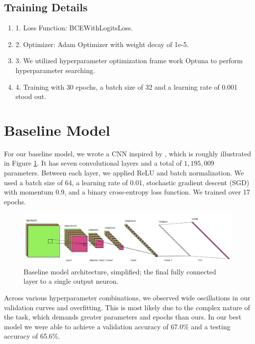 \documentclass{article} %
\begin{document}
\subsection{Training Details}
\begin {enumerate}
\item[1.]Loss Function: BCEWithLogitsLoss.
\item[2.]Optimizer: Adam Optimizer with weight decay of 1e-5.
\item[3.]We utilized hyperparameter optimization frame work Optuna \citep{akiba2019optuna} to perform hyperparameter searching. 
\item[4.]Training with 30 epochs, a batch size of 32 and a learning rate of 0.001 stood out.
\end{enumerate}

\section{Baseline Model}

For our baseline model, we wrote a CNN inspired by \citet{wang2020cnngeneratedimagessurprisinglyeasy}, which is roughly illustrated in Figure \ref{fig:baseline_arch}. It has seven convolutional layers and a total of $1,195,009$ parameters. Between each layer, we applied ReLU and batch normalization. We used a batch size of 64, a learning rate of 0.01, stochastic gradient descent (SGD) with momentum 0.9, and a binary cross-entropy loss function. We trained over 17 epochs.

\begin{figure}[h]
    \begin{center}
        \includegraphics[scale=0.45]{figs/baseline.png}
    \end{center}
    \caption{Baseline model architecture, simplified; the final fully connected layer to a single output neuron.}
    \label{fig:baseline_arch}
\end{figure}

Across various hyperparameter combinations, we observed wide oscillations in our validation curves and overfitting. This is most likely due to the complex nature of the task, which demands greater parameters and epochs than ours. In our best model we were able to achieve a validation accuracy of 67.0\% and a testing accuracy of 65.6\%.
\end{document}
